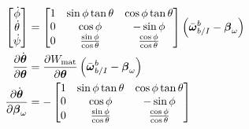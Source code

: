 \begin{align*}
  \begin{bmatrix}
    \dot{\phi} \\
    \dot{\theta} \\
    \dot{\psi}
  \end{bmatrix}
  &=
  \begin{bmatrix}
    1 & \sin\phi\tan\theta & \cos\phi\tan\theta \\
    0 & \cos\phi & -\sin\phi \\
    0 & \frac{\sin\phi}{\cos\theta} & \frac{\cos\phi}{\cos\theta}
  \end{bmatrix}
  \left( \bar{\boldsymbol{\mathrm{\omega}}}_{b/I}^b - \boldsymbol{\mathrm{\beta}}_\omega \right) \\
  \frac{\partial \dot{\boldsymbol{\mathrm{\theta}}}}{\partial \boldsymbol{\mathrm{\theta}}} &= 
  \frac{\partial W_{\text{mat}}}{\partial \boldsymbol{\mathrm{\theta}}} \left(
  \bar{\boldsymbol{\mathrm{\omega}}}_{b/I}^b - \boldsymbol{\mathrm{\beta}}_\omega \right) \\
  \frac{\partial \dot{\boldsymbol{\mathrm{\theta}}}}{\partial \boldsymbol{\mathrm{\beta}}_\omega} &= -
  \begin{bmatrix}
    1 & \sin\phi\tan\theta & \cos\phi\tan\theta \\
    0 & \cos\phi & -\sin\phi \\
    0 & \frac{\sin\phi}{\cos\theta} & \frac{\cos\phi}{\cos\theta}
  \end{bmatrix}
\end{align*}

